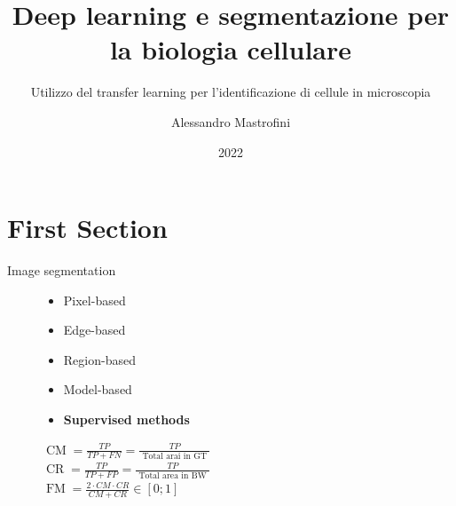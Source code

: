 \documentclass[aspectratio=169,xcolor=dvipsnames]{beamer}
\title[short title]{Deep learning e segmentazione per la biologia cellulare} %
\subtitle{Utilizzo del transfer learning per l'identificazione di cellule in microscopia}
\author[Pin-Yen] {Alessandro Mastrofini}
\institute[NTU] %
{
Elaborazione di Immagini \\
Università degli Studi di Roma Tor Vergata%
}
\date{2022} %
\begin{document}
\begin{frame}
    \titlepage
\end{frame}

\section{First Section}

\begin{frame}{Image segmentation}
	\begin{figure}
	\centering
\begin{minipage}{0.5\linewidth}
\begin{itemize}
	\item Pixel-based
	\item Edge-based
	\item Region-based
	\item Model-based
	\item \textbf{Supervised methods}
\end{itemize}
\vspace{0.1\linewidth}

\small{$\operatorname{CM}=\frac{T P}{T P+F N}=\frac{T P}{\text { Total arai in GT }}$}\\


\small{$
\operatorname{CR}=\frac{T P}{T P+F P}=\frac{T P}{\text { Total area in BW }}$}\\


\small{$
\operatorname{FM}=\frac{2 \cdot CM \cdot C R}{C M+C R} \in[0 ; 1]
$}

\end{minipage}
\begin{minipage}{0.35\linewidth}
\tiny{\def\svgwidth{\linewidth}
 }
\end{minipage}
\end{figure}
\end{frame}
\end{document}
